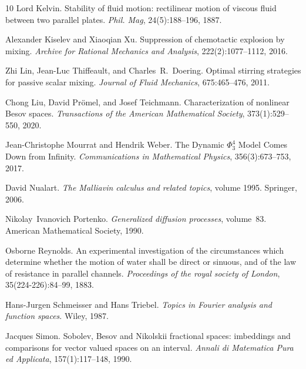 \documentclass[11pt,oneside,reqno]{amsart}
\newcommand{\tmtextit}[1]{{{\itshape{#1}}}}
\numberwithin{equation}{section}
\begin{document}
\begin{thebibliography}{10}
  Lord Kelvin. {\newblock}Stability of fluid motion:
  rectilinear motion of viscous fluid between two parallel plates.
  {\newblock}\tmtextit{Phil. Mag}, 24(5):188--196, 1887.{\newblock}
  
  Alexander Kiselev  and  Xiaoqian Xu.
  {\newblock}Suppression of chemotactic explosion by mixing.
  {\newblock}\tmtextit{Archive for Rational Mechanics and Analysis},
  222(2):1077--1112, 2016.{\newblock}
  
  Zhi Lin, Jean-Luc Thiffeault, and 
  Charles~R.~Doering. {\newblock}Optimal stirring strategies for passive
  scalar mixing. {\newblock}\tmtextit{Journal of Fluid Mechanics},
  675:465--476, 2011.{\newblock}
  
  Chong Liu, David Pr{\"o}mel, and  Josef Teichmann.
  {\newblock}Characterization of nonlinear Besov spaces.
  {\newblock}\tmtextit{Transactions of the American Mathematical Society},
  373(1):529--550, 2020.{\newblock}
  
  Jean-Christophe Mourrat  and  Hendrik Weber.
  {\newblock}The Dynamic $\Phi^4_3$ Model Comes Down from Infinity.
  {\newblock}\tmtextit{Communications in Mathematical Physics},
  356(3):673--753, 2017.{\newblock}
  
  David Nualart. {\newblock}\tmtextit{The Malliavin
  calculus and related topics},  volume  1995. {\newblock}Springer,
  2006.{\newblock}
  
  Nikolay~Ivanovich Portenko.
  {\newblock}\tmtextit{Generalized diffusion processes},  volume~83.
  {\newblock}American Mathematical Society, 1990.{\newblock}
  
  Osborne Reynolds. {\newblock}An experimental
  investigation of the circumstances which determine whether the motion of
  water shall be direct or sinuous, and of the law of resistance in parallel
  channels. {\newblock}\tmtextit{Proceedings of the royal society of London},
  35(224-226):84--99, 1883.{\newblock}
  
  Hans-Jurgen Schmeisser  and  Hans Triebel.
  {\newblock}\tmtextit{Topics in Fourier analysis and function spaces}.
  {\newblock}Wiley, 1987.{\newblock}
  
  Jacques Simon. {\newblock}Sobolev, Besov and Nikolskii
  fractional spaces: imbeddings and comparisons for vector valued spaces on an
  interval. {\newblock}\tmtextit{Annali di Matematica Pura ed Applicata},
  157(1):117--148, 1990.{\newblock}
  

\end{thebibliography}
\end{document}
